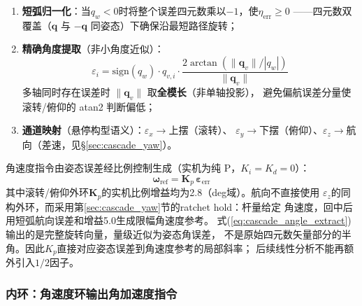 \begin{enumerate}[label=(\arabic*)]
    \item \textbf{短弧归一化}：当$q_w<0$时将整个误差四元数乘以$-1$，使$\eta_{\mathrm{err}}\geq0$
          ——四元数双覆盖（$\mathbf{q}$ 与 $-\mathbf{q}$ 同姿态）下确保沿最短路径旋转；
    \item \textbf{精确角度提取}（非小角度近似）：
          \begin{equation}
              \varepsilon_i = \mathrm{sign}(q_w)\cdot q_{v,i}\cdot
              \frac{2\arctan(\|\mathbf{q}_v\|/|q_w|)}{\|\mathbf{q}_v\|}
              \label{eq:cascade_angle_extract}
          \end{equation}
          多轴同时存在误差时 $\|\mathbf{q}_v\|$ 取\textbf{全模长}（非单轴投影），
          避免偏航误差分量使滚转/俯仰的 atan2 判断偏低；
    \item \textbf{通道映射}（悬停构型语义）：$\varepsilon_x\to$上摆（滚转）、
          $\varepsilon_y\to$下摆（俯仰）、$\varepsilon_z\to$航向（差速，见§\ref{sec:cascade_yaw}）。
\end{enumerate}

角速度指令由姿态误差经比例控制生成（实机为纯 P，$K_i=K_d=0$）：
\begin{equation}
    \boxed{
    \boldsymbol{\omega}_{\mathrm{ref}}
    = \mathbf{K}_p\,\boldsymbol{\varepsilon}_{\mathrm{err}}
    }
    \label{eq:cascade_outer_ch}
\end{equation}
其中滚转/俯仰外环$\mathbf{K}_p$的实机比例增益均为2.8（deg域）。航向不直接使用
$\varepsilon_z$的同构外环，而采用第\ref{sec:cascade_yaw}节的ratchet hold：杆量给定
角速度，回中后用短弧航向误差和增益5.0生成限幅角速度参考。
式(\ref{eq:cascade_angle_extract})输出的是完整旋转向量，量级近似为姿态角误差，
不是原始四元数矢量部分的半角。因此$K_p$直接对应姿态误差到角速度参考的局部斜率；
后续线性分析不能再额外引入$1/2$因子。

\subsubsection{内环：角速度环输出角加速度指令}

